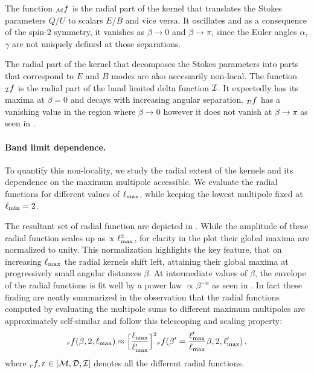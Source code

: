 The function ${_{\mathcal{M}}f}$ is the radial part of the kernel that translates the Stokes parameters $Q$/$U$ to scalars $E$/$B$ and vice versa.  It oscillates and as a consequence of the spin-2 symmetry, it vanishes as $\beta \rightarrow 0$ and $\beta \rightarrow \pi$, since the Euler angles $\alpha$, $\gamma$ are not uniquely defined at those separations.

The radial part of the kernel that decomposes the  Stokes parameters into parts that correspond to $E$ and $B$ modes  are also  necessarily non-local.  The function ${_{\mathcal{I}}f}$ is the radial part of the band limited delta function $\mathcal{I}$.  It expectedly has its maxima at $\beta=0$ and decays with increasing angular separation.  ${_{\mathcal{D}}f}$ has a vanishing value in the region where $\beta \rightarrow 0$ however it does not vanish at $\beta \rightarrow \pi$ as seen in .

\paragraph{Band limit dependence.} 
To quantify this non-locality, we study the radial extent of the kernels and its dependence on the maximum multipole accessible. We evaluate the radial functions for different values of $\ell_{\rm max}$, while keeping the lowest multipole fixed at $\ell_{\rm min}=2$. 

The resultant set of radial function are depicted in . While the amplitude of these radial function scales up as $\propto \ell_{\rm max}^2$, for clarity in the plot their global maxima are normalized to unity.  This normalization highlights the key feature, that on increasing $\ell_{\rm max}$ the radial kernels shift left, attaining their global maxima at progressively small angular distances $\beta$.  At intermediate values of $\beta$, the envelope of the radial functions is fit well by a power law $ \propto \beta^{-n}$ as seen in .
In fact these finding are neatly summarized in the observation that the radial functions computed by evaluating the multipole sums to different maximum multipoles are approximately self-similar and follow this telescoping and scaling property: $${}_rf(\beta,2,\ell_{\rm max}) \approx \Big[\frac{\ell_{\rm max}}{\ell'_{\rm max}}\Big]^2{}_rf(\beta'=\frac{\ell'_{\rm max}}{\ell_{\rm max}} \beta ,2,\ell'_{\rm max}) \,,$$ where ${}_rf , r \in [\mathcal{M}, \mathcal{D},\mathcal{I}]$ denotes all the different radial functions. 


